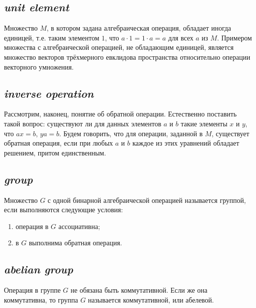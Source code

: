 \subsection*{ \textit{unit element}}
\begin{rusblock}
Множество $M$, в котором задана алгебраическая операция, обладает иногда единицей, т.е. таким элементом $1$, что $a\cdot1=1\cdot a=a$ для всех $a$ из $M$. Примером множества с алгебраической операцией, не обладающим единицей, является множество векторов трёхмерного евклидова пространства относительно операции векторного умножения.
\end{rusblock}

\subsection*{ \textit{inverse operation}}
\begin{rusblock}
Рассмотрим, наконец, понятие об обратной операции. Естественно поставить такой вопрос: существуют ли для данных элементов $a$ и $b$ такие элементы $x$ и $y$, что $ax=b$, $ya=b$. Будем говорить, что для операции, заданной в $M$, существует обратная операция, если при любых $a$ и $b$ каждое из этих уравнений обладает решением, притом единственным.
\end{rusblock}

\subsection*{ \textit{group}}
\begin{rusblock}
Множество $G$ с одной бинарной алгебраической операцией называется группой, если выполняются следующие условия:
\begin{enumerate}[leftmargin=2.2em]
\item операция в $G$ ассоциативна;
\item в $G$ выполнима обратная операция.
\end{enumerate}
\end{rusblock}

\subsection*{ \textit{abelian group}}
\begin{rusblock}
Операция в группе $G$ не обязана быть коммутативной. Если же она коммутативна, то группа $G$ называется коммутативной, или абелевой.
\end{rusblock}


